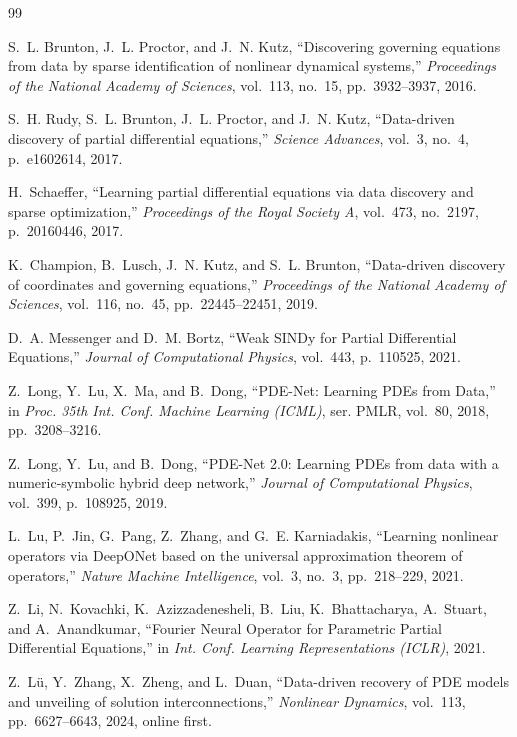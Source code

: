 \documentclass[10pt,journal,compsoc]{IEEEtran}
\begin{document}
\begin{thebibliography}{99}

S.~L. Brunton, J.~L. Proctor, and J.~N. Kutz, ``Discovering governing
equations from data by sparse identification of nonlinear dynamical
systems,'' \emph{Proceedings of the National Academy of Sciences},
vol.~113, no.~15, pp.~3932--3937, 2016.

S.~H. Rudy, S.~L. Brunton, J.~L. Proctor, and J.~N. Kutz, ``Data-driven
discovery of partial differential equations,'' \emph{Science Advances},
vol.~3, no.~4, p.~e1602614, 2017.

H.~Schaeffer, ``Learning partial differential equations via data discovery
and sparse optimization,'' \emph{Proceedings of the Royal Society A},
vol.~473, no.~2197, p.~20160446, 2017.

K.~Champion, B.~Lusch, J.~N. Kutz, and S.~L. Brunton, ``Data-driven
discovery of coordinates and governing equations,'' \emph{Proceedings of
the National Academy of Sciences}, vol.~116, no.~45, pp.~22445--22451, 2019.

D.~A. Messenger and D.~M. Bortz, ``Weak SINDy for Partial Differential
Equations,'' \emph{Journal of Computational Physics}, vol.~443, p.~110525,
2021.

Z.~Long, Y.~Lu, X.~Ma, and B.~Dong, ``PDE-Net: Learning PDEs from Data,''
in \emph{Proc. 35th Int. Conf. Machine Learning (ICML)},
ser. PMLR, vol.~80, 2018, pp.~3208--3216.

Z.~Long, Y.~Lu, and B.~Dong, ``PDE-Net 2.0: Learning PDEs from data with a
numeric-symbolic hybrid deep network,'' \emph{Journal of Computational
Physics}, vol.~399, p.~108925, 2019.

L.~Lu, P.~Jin, G.~Pang, Z.~Zhang, and G.~E. Karniadakis, ``Learning
nonlinear operators via DeepONet based on the universal approximation
theorem of operators,'' \emph{Nature Machine Intelligence}, vol.~3, no.~3,
pp.~218--229, 2021.

Z.~Li, N.~Kovachki, K.~Azizzadenesheli, B.~Liu, K.~Bhattacharya, A.~Stuart,
and A.~Anandkumar, ``Fourier Neural Operator for Parametric Partial
Differential Equations,'' in \emph{Int. Conf. Learning Representations
(ICLR)}, 2021.

Z.~L\"u, Y.~Zhang, X.~Zheng, and L.~Duan, ``Data-driven recovery of PDE
models and unveiling of solution interconnections,'' \emph{Nonlinear
Dynamics}, vol.~113, pp.~6627--6643, 2024, online first.


\end{thebibliography}
\end{document}
